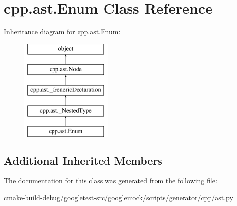 \hypertarget{classcpp_1_1ast_1_1Enum}{}\section{cpp.\+ast.\+Enum Class Reference}
\label{classcpp_1_1ast_1_1Enum}
Inheritance diagram for cpp.\+ast.\+Enum\+:\begin{figure}[H]
\begin{center}
\leavevmode
\includegraphics[height=5.000000cm]{classcpp_1_1ast_1_1Enum}
\end{center}
\end{figure}
\subsection*{Additional Inherited Members}


The documentation for this class was generated from the following file\+:\begin{DoxyCompactItemize}
\item 
cmake-\/build-\/debug/googletest-\/src/googlemock/scripts/generator/cpp/\mbox{\hyperlink{ast_8py}{ast.\+py}}\end{DoxyCompactItemize}
